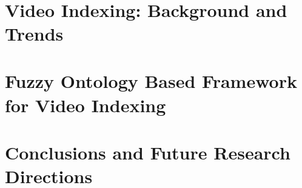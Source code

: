 \documentclass[a4paper,12pt,onecolumn,oneside]{regimthese}
\begin{document}

	\Emptyfancy
	
	
	
	
	

	\newpage ~


			
	\part{Video Indexing: Background and Trends}
			
			
	\part{Fuzzy Ontology Based Framework for Video Indexing}
			
			
			
			
	\part{Conclusions and Future Research Directions}
			
\appendix








\bibliographyfancy




\newpage \pagestyle{empty} ~


\end{document}
